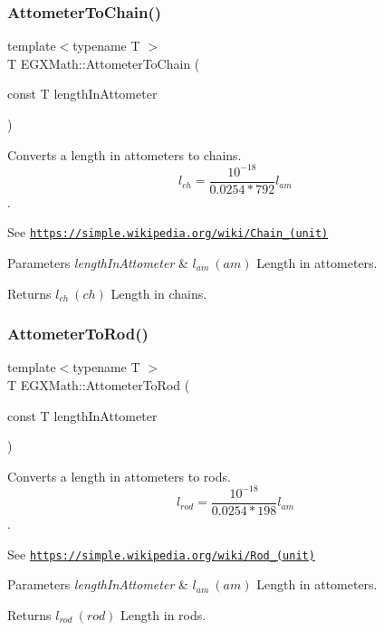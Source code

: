 \subsubsection{\texorpdfstring{Attometer\+To\+Chain()}{AttometerToChain()}}
{\footnotesize\ttfamily template$<$typename T $>$ \\
T E\+G\+X\+Math\+::\+Attometer\+To\+Chain (\begin{DoxyParamCaption}\item[{const T}]{length\+In\+Attometer }\end{DoxyParamCaption})}



Converts a length in attometers to chains. \[ l_{ch}= \frac{10^{-18}}{0.0254 * 792} l_{am} \]. 

See \href{https://simple.wikipedia.org/wiki/Chain_(unit)}{\tt https\+://simple.\+wikipedia.\+org/wiki/\+Chain\+\_\+(unit)} 
\begin{DoxyParams}{Parameters}
{\em length\+In\+Attometer} & $ l_{am}\ (am)$ Length in attometers. \\
\hline
\end{DoxyParams}
\begin{DoxyReturn}{Returns}
$ l_{ch}\ (ch)$ Length in chains. 
\end{DoxyReturn}
\mbox{\label{group___e_g_x_math-_conversions-_length_conversions-_s_i-_attometer-_surveyors_ga4bdcb3e42e19c5f1ca38ee513654dfa4}} 
\subsubsection{\texorpdfstring{Attometer\+To\+Rod()}{AttometerToRod()}}
{\footnotesize\ttfamily template$<$typename T $>$ \\
T E\+G\+X\+Math\+::\+Attometer\+To\+Rod (\begin{DoxyParamCaption}\item[{const T}]{length\+In\+Attometer }\end{DoxyParamCaption})}



Converts a length in attometers to rods. \[ l_{rod}= \frac{10^{-18}}{0.0254 * 198} l_{am} \]. 

See \href{https://simple.wikipedia.org/wiki/Rod_(unit)}{\tt https\+://simple.\+wikipedia.\+org/wiki/\+Rod\+\_\+(unit)} 
\begin{DoxyParams}{Parameters}
{\em length\+In\+Attometer} & $ l_{am}\ (am)$ Length in attometers. \\
\hline
\end{DoxyParams}
\begin{DoxyReturn}{Returns}
$ l_{rod}\ (rod)$ Length in rods. 
\end{DoxyReturn}
